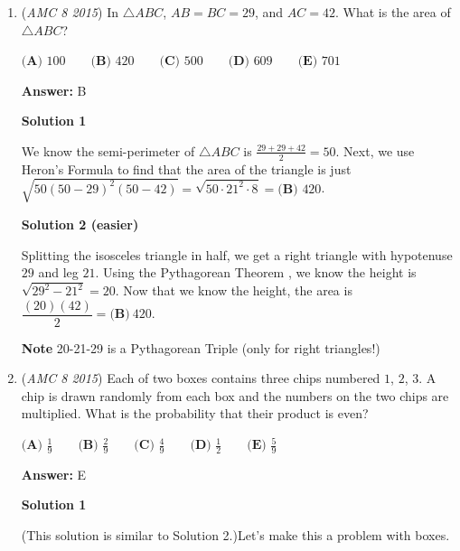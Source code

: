 \begin{enumerate}
Because $40$ is less than the score of every game they've played so far, the measures of center will never rise. Only measures of spread, such as the $\boxed{\textbf{(A)}~\text{range}}$, may increase.

 


 


	\item (\textit{AMC 8 2015}) In $\triangle ABC$, $AB=BC=29$, and $AC=42$. What is the area of $\triangle ABC$?


 $\textbf{(A) }100\qquad\textbf{(B) }420\qquad\textbf{(C) }500\qquad\textbf{(D) }609\qquad \textbf{(E) }701$

 \textbf{Answer: }B



\textbf{Solution 1}

We know the semi-perimeter of $\triangle ABC$ is $\frac{29+29+42}{2}=50$. Next, we use Heron's Formula to find that the area of the triangle is just $\sqrt{50(50-29)^2(50-42)}=\sqrt{50 \cdot 21^2 \cdot 8}=\boxed{\textbf{(B) }420}$.

 



\textbf{Solution 2 (easier)}

Splitting the isosceles triangle in half, we get a right triangle with hypotenuse $29$ and leg $21$. Using the Pythagorean Theorem , we know the height is $\sqrt{29^2-21^2}=20$. Now that we know the height, the area is$\dfrac{(20)(42)}{2} = \boxed{\textbf{(B)}~420}$.

 


 \textbf{Note} 20-21-29 is a Pythagorean Triple (only for right triangles!)

 


	\item (\textit{AMC 8 2015}) Each of two boxes contains three chips numbered $1$, $2$, $3$. A chip is drawn randomly from each box and the numbers on the two chips are multiplied. What is the probability that their product is even?


 $\textbf{(A) }\frac{1}{9}\qquad\textbf{(B) }\frac{2}{9}\qquad\textbf{(C) }\frac{4}{9}\qquad\textbf{(D) }\frac{1}{2}\qquad \textbf{(E) }\frac{5}{9}$

 \textbf{Answer: }E



\textbf{Solution 1}

(This solution is similar to Solution 2.)Let's make this a problem with boxes. 


\end{enumerate}
